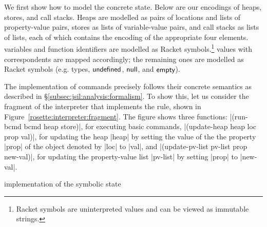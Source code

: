 We first show
how to model the concrete \jsil state. Below are our \rosette encodings of \jsil heaps, stores, 
and call stacks. 
Heaps are modelled as pairs of locations and lists of property-value pairs, 
stores as lists of variable-value pairs, and call stacks as lists of lists, each of which
contains the \rosette encoding of the appropriate four elements. 
\jsil variables and function identifiers are modelled 
as Racket symbols.\footnote{Racket symbols are uninterpreted values and can be viewed as immutable strings.} 
\jsil values with \rosette correspondents are mapped accordingly; the remaining 
ones are modelled as Racket symbols (e.g. \jsil types, ${\sf undefined}$, ${\sf null}$, and ${\sf empty}$). 

The implementation of \jsil commands precisely follows their concrete semantics as 
described in \S\ref{subsec:jsil:analysis:formalism}. 
To show this, let us consider the fragment of the \jsil interpreter that implements 
the  rule, shown in Figure~\ref{rosette:interpreter:fragment}.
The figure shows three functions:  \schemeinline|(run-bcmd bcmd heap store)|, for 
executing basic commands,  \schemeinline|(update-heap heap loc prop val)|, for 
updating the heap \schemeinline|heap| by setting the value of the 
the property \schemeinline|prop| of the object denoted by \schemeinline|loc| to \schemeinline|val|, 
and  \schemeinline|(update-pv-list pv-list prop new-val)|,
for updating the property-value list \schemeinline|pv-list| by setting \schemeinline|prop|
to \schemeinline|new-val|.

\begin{display}{\rosette implementation of the \jsil symbolic state}
{\scriptsize
{}}
\end{display}

